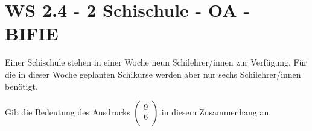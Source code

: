 \section{WS 2.4 - 2 Schischule - OA - BIFIE}


\begin{beispiel}[WS 2.4]{1} %
Einer Schischule stehen in einer Woche neun Schilehrer/innen zur Verfügung. Für die in dieser
Woche geplanten Schikurse werden aber nur sechs Schilehrer/innen benötigt. \leer


Gib die Bedeutung des Ausdrucks 
$\begin{pmatrix}
9 \\
6\\	
\end{pmatrix}$ in diesem Zusammenhang an. 

\end{beispiel}